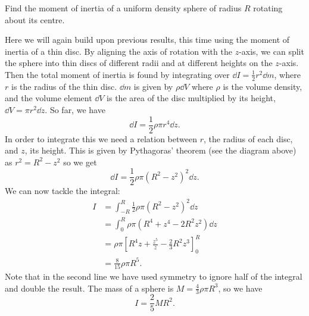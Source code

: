 \documentclass[../classical_mechanics.tex]{subfiles}
\begin{document}
        \begin{example}
            Find the moment of inertia of a uniform density sphere of radius $R$ rotating about its centre.
                    
            Here we will again build upon previous results, this time using the moment of inertia of a thin disc.
            By aligning the axis of rotation with the $z$-axis, we can split the sphere into thin discs of different radii and at different heights on the $z$-axis.
            Then the total moment of inertia is found by integrating over $\dd{I}=\frac{1}{2}r^2\dd{m}$, where $r$ is the radius of the thin disc.
            $\dd{m}$ is given by $\rho\dd{V}$ where $\rho$ is the volume density, and the volume element $\dd{V}$ is the area of the disc multiplied by its height, $\dd{V}=\pi r^2\dd{z}$.
            So far, we have
            \begin{equation}
                \dd{I}=\frac{1}{2}\rho\pi r^4\dd{z}.
            \end{equation}
            In order to integrate this we need a relation between $r$, the radius of each disc, and $z$, its height.
            This is given by Pythagoras' theorem (see the diagram above) as $r^2=R^2-z^2$ so we get
            \begin{equation}
                \dd{I}=\frac{1}{2}\rho\pi(R^2-z^2)^2\dd{z}.
            \end{equation}
            We can now tackle the integral:
            \begin{align}
                I&=\int_{-R}^{R}\frac{1}{2}\rho\pi(R^2-z^2)^2\dd{z}\\
                &=\int_0^R\rho\pi(R^4+z^4-2R^2z^2)\dd{z}\\
                &=\rho\pi\left[R^4z+\frac{z^5}{z}-\frac{2}{3}R^2z^3\right]_0^R\\
                &=\frac{8}{15}\rho\pi R^5.
            \end{align}
            Note that in the second line we have used symmetry to ignore half of the integral and double the result.
            The mass of a sphere is $M=\frac{4}{3}\rho\pi R^3$, so we have
            \begin{equation}
                I=\frac{2}{5}MR^2.
            \end{equation}
        \end{example}
\end{document}
